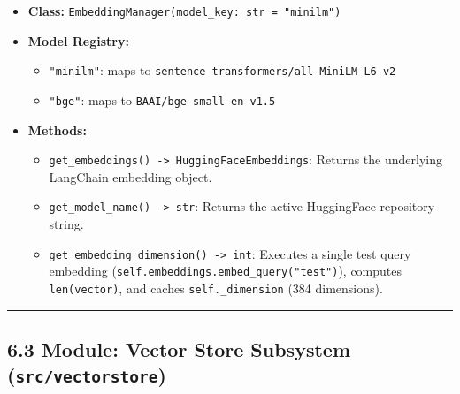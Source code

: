 \documentclass[
]{article}
\providecommand{\tightlist}{%
  \setlength{\itemsep}{0pt}\setlength{\parskip}{0pt}}
\begin{document}
\begin{itemize}
\tightlist
\item
  \textbf{Class:}
  \texttt{EmbeddingManager(\allowbreak model\_\allowbreak key:\ \allowbreak str\ \allowbreak =\allowbreak \ \allowbreak "minilm")\allowbreak }
\item
  \textbf{Model Registry:}

  \begin{itemize}
  \tightlist
  \item
    \texttt{"minilm"}: maps to
    \texttt{sentence-transformers/\allowbreak all-MiniLM-L6-v2}
  \item
    \texttt{"bge"}: maps to \texttt{BAAI/\allowbreak bge-small-en-v1.5}
  \end{itemize}
\item
  \textbf{Methods:}

  \begin{itemize}
  \tightlist
  \item
    \texttt{get\_\allowbreak embeddings(\allowbreak )\allowbreak \ \allowbreak -\textgreater{}\allowbreak \ \allowbreak HuggingFaceEmbeddings}:
    Returns the underlying LangChain embedding object.
  \item
    \texttt{get\_\allowbreak model\_\allowbreak name(\allowbreak )\allowbreak \ \allowbreak -\textgreater{}\allowbreak \ \allowbreak str}: Returns the
    active HuggingFace repository string.
  \item
    \texttt{get\_\allowbreak embedding\_\allowbreak dimension(\allowbreak )\allowbreak \ \allowbreak -\textgreater{}\allowbreak \ \allowbreak int}: Executes
    a single test query embedding
    (\texttt{self.\allowbreak embeddings.\allowbreak embed\_\allowbreak query(\allowbreak "test")\allowbreak }), computes
    \texttt{len(\allowbreak vector)\allowbreak }, and caches \texttt{self.\_\allowbreak dimension} (384
    dimensions).
  \end{itemize}
\end{itemize}

\begin{center}\rule{0.5\linewidth}{0.5pt}\end{center}

\subsection{\texorpdfstring{6.3 Module: Vector Store Subsystem
(\texttt{src/\allowbreak vectorstore})}{6.3 Module: Vector Store Subsystem (src/vectorstore)}}\label{module-vector-store-subsystem-srcvectorstore}
\end{document}
